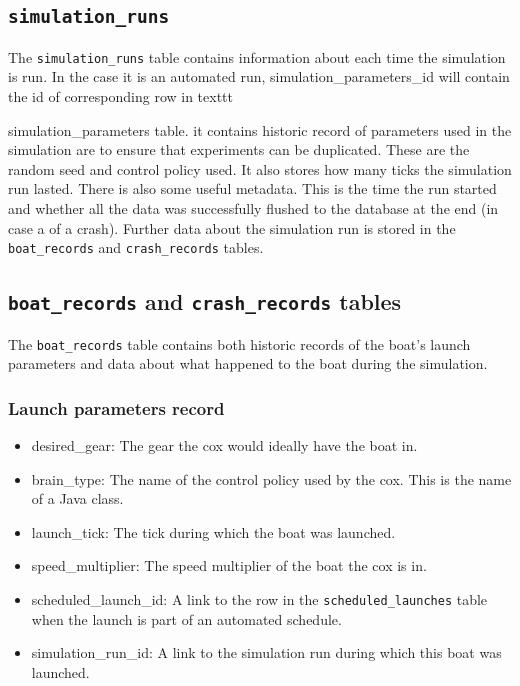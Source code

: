 \subsection{\texttt{simulation\_runs}}
The \texttt{simulation\_runs} table contains information about each
time the simulation is run. In the case it is an automated run,
simulation\_parameters\_id will contain the id of corresponding row in
texttt{simulation\_parameters table. it contains historic record of parameters
  used in the simulation are to ensure that experiments can be
  duplicated. These are the random seed and control policy used. It
  also stores how many ticks the simulation run lasted. There is also
  some useful metadata. This is the time the run started and whether
  all the data was successfully flushed to the database at the end (in
  case a of a crash). Further data about the simulation run is stored
  in the \texttt{boat\_records} and \texttt{crash\_records} tables.

\subsection{\texttt{boat\_records} and \texttt{crash\_records} tables}
The \texttt{boat\_records} table contains both historic records of the
boat's launch parameters and data about what happened to the boat
during the simulation.

\subsubsection{Launch parameters record}

\begin{itemize}
  \item{desired\_gear:} The gear the cox would ideally have the boat
    in.
  \item{brain\_type:} The name of the control policy used by the
    cox. This is the name of a Java class.
  \item{launch\_tick:} The tick during which the boat was launched.
  \item{speed\_multiplier:} The speed multiplier of the boat the cox
    is in.
  \item{scheduled\_launch\_id:} A link to the row in the
    \texttt{scheduled\_launches} table when the launch is part of an
    automated schedule.
  \item{simulation\_run\_id:} A link to the simulation run during
    which this boat was launched.
\end{itemize}

}
